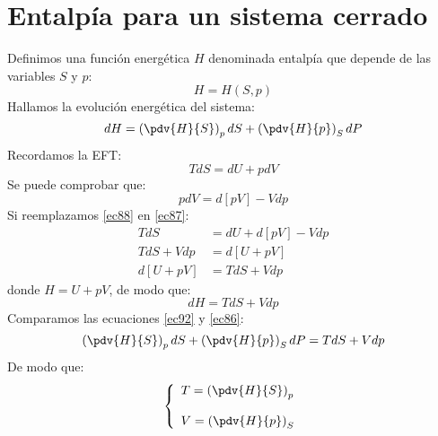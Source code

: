 \documentclass[../main]{subfiles}
\begin{document}
\section{Entalpía para un sistema cerrado}
Definimos una función energética $H$ denominada entalpía que depende de las variables $S$ y $p$:
\begin{equation}
    H=H(S,p)
\end{equation}
Hallamos la evolución energética del sistema:
\begin{equation}
    dH=\left( \pdv{H}{S}\right)_p dS+\left( \pdv{H}{p}\right)_S dP
    \label{ec86}
\end{equation}
Recordamos la EFT:
\begin{equation}
    TdS=dU+pdV
    \label{ec87}
\end{equation}
Se puede comprobar que:
\begin{equation}
    pdV=d[pV]-Vdp
    \label{ec88}
\end{equation}
Si reemplazamos \eqref{ec88} en \eqref{ec87}:
\begin{align}
    TdS     & =dU+d[pV]-Vdp \\
    TdS+Vdp & =d[U+pV]      \\
    d[U+pV] & =TdS+Vdp
\end{align}
donde $H=U+pV$, de modo que:
\begin{equation}
    dH=TdS+Vdp
    \label{ec92}
\end{equation}
Comparamos las ecuaciones \eqref{ec92} y \eqref{ec86}:
\begin{equation}
    \left( \pdv{H}{S}\right)_p dS+\left( \pdv{H}{p}\right)_S dP=TdS+Vdp
\end{equation}
De modo que:
\begin{equation}
    \left\{
    \begin{array}{l}
        T=\displaystyle \left( \pdv{H}{S} \right)_{p} \\ \\
        V=\displaystyle \left(\pdv{H}{p}\right)_{S}
    \end{array}
    \right.
\end{equation}
\end{document}
